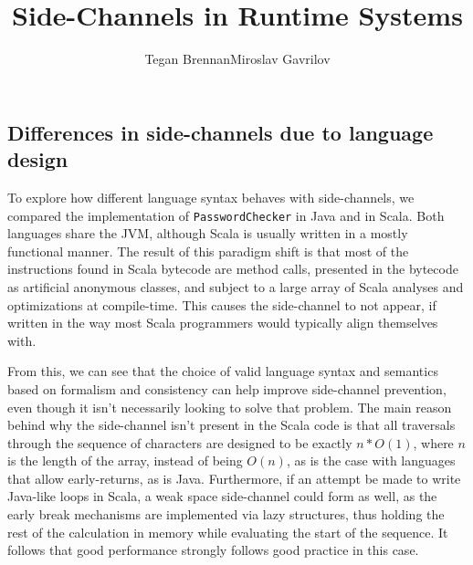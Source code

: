 \documentclass{article}
\begin{document}
     
\title{Side-Channels in Runtime Systems}
\author{Tegan Brennan\qquad Miroslav Gavrilov}
\maketitle








\subsection{Differences in side-channels due to language design}

To explore how different language syntax behaves with side-channels, we compared the implementation of \texttt{PasswordChecker} in Java and in Scala. Both languages share the JVM, although Scala is usually written in a mostly functional manner. The result of this paradigm shift is that most of the instructions found in Scala bytecode are method calls, presented in the bytecode as artificial anonymous classes, and subject to a large array of Scala analyses and optimizations at compile-time. This causes the side-channel to not appear, if written in the way most Scala programmers would typically align themselves with.


From this, we can see that the choice of valid language syntax and semantics based on formalism and consistency can help improve side-channel prevention, even though it isn't necessarily looking to solve that problem. The main reason behind why the side-channel isn't present in the Scala code is that all traversals through the sequence of characters are designed to be exactly $n * O(1)$, where $n$ is the length of the array, instead of being $O(n)$, as is the case with languages that allow early-returns, as is Java. Furthermore, if an attempt be made to write Java-like loops in Scala, a weak space side-channel could form as well, as the early break mechanisms are implemented via lazy structures, thus holding the rest of the calculation in memory while evaluating the start of the sequence. It follows that good performance strongly follows good practice in this case.



\pagebreak


\end{document}
